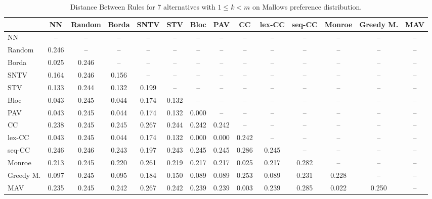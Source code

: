 
\begin{table*}
\centering
\begin{tabular}{lccccccccccccc}
\toprule
 & NN & Random & Borda & SNTV & STV & Bloc & PAV & CC & lex-CC & seq-CC & Monroe & Greedy M. & MAV \\
\midrule
NN & -- & -- & -- & -- & -- & -- & -- & -- & -- & -- & -- & -- & -- \\
Random & 0.246 & -- & -- & -- & -- & -- & -- & -- & -- & -- & -- & -- & -- \\
Borda & 0.025 & 0.246 & -- & -- & -- & -- & -- & -- & -- & -- & -- & -- & -- \\
SNTV & 0.164 & 0.246 & 0.156 & -- & -- & -- & -- & -- & -- & -- & -- & -- & -- \\
STV & 0.133 & 0.244 & 0.132 & 0.199 & -- & -- & -- & -- & -- & -- & -- & -- & -- \\
Bloc & 0.043 & 0.245 & 0.044 & 0.174 & 0.132 & -- & -- & -- & -- & -- & -- & -- & -- \\
PAV & 0.043 & 0.245 & 0.044 & 0.174 & 0.132 & 0.000 & -- & -- & -- & -- & -- & -- & -- \\
CC & 0.238 & 0.245 & 0.245 & 0.267 & 0.244 & 0.242 & 0.242 & -- & -- & -- & -- & -- & -- \\
lex-CC & 0.043 & 0.245 & 0.044 & 0.174 & 0.132 & 0.000 & 0.000 & 0.242 & -- & -- & -- & -- & -- \\
seq-CC & 0.246 & 0.246 & 0.243 & 0.197 & 0.243 & 0.245 & 0.245 & 0.286 & 0.245 & -- & -- & -- & -- \\
Monroe & 0.213 & 0.245 & 0.220 & 0.261 & 0.219 & 0.217 & 0.217 & 0.025 & 0.217 & 0.282 & -- & -- & -- \\
Greedy M. & 0.097 & 0.245 & 0.095 & 0.184 & 0.150 & 0.089 & 0.089 & 0.253 & 0.089 & 0.231 & 0.228 & -- & -- \\
MAV & 0.235 & 0.245 & 0.242 & 0.267 & 0.242 & 0.239 & 0.239 & 0.003 & 0.239 & 0.285 & 0.022 & 0.250 & -- \\
\bottomrule
\end{tabular}

\caption{Distance Between Rules for 7 alternatives with $1 \leq k < m$ on Mallows preference distribution.}
\end{table*}
